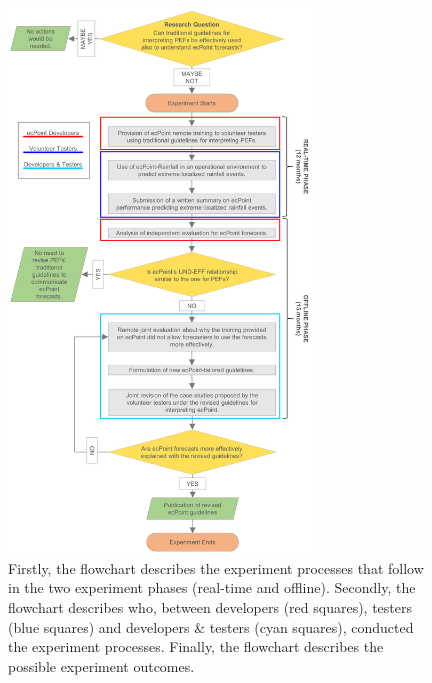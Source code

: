 \documentclass[twocol]{ametsocV5} %
\begin{document}
\begin{figure}
\centerline{\includegraphics[width=19pc]{manuscript/Figures/Methods_FlowChart.png}}
\caption{Firstly, the flowchart describes the experiment processes that follow in the two experiment phases (real-time and offline). Secondly, the flowchart describes who, between developers (red squares), testers (blue squares) and developers & testers (cyan squares), conducted the experiment processes. Finally, the flowchart describes the possible experiment outcomes.}
\label{FlowChart}
\end{figure}
\end{document}
